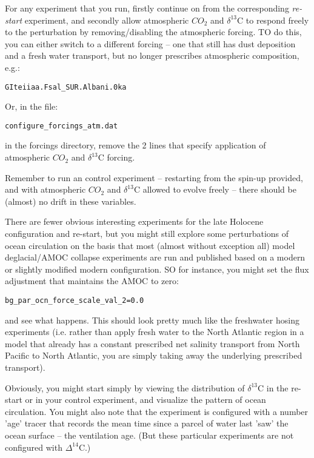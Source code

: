 \documentclass[11pt,fleqn]{book} %
\begin{document}
For any experiment that you run, firstly continue on from the corresponding \textit{re-start} experiment, and secondly allow atmospheric \(CO_{2}\) and $\delta^{13}$C to respond freely to the perturbation by removing/disabling the atmospheric forcing. TO do this, you can either switch to a different forcing -- one that still has dust deposition and a fresh water transport, but no longer prescribes atmospheric composition, e.g.:
\vspace{-2mm}\begin{verbatim}
GIteiiaa.Fsal_SUR.Albani.0ka
\end{verbatim}\vspace{-2mm}
Or, in the file:
\vspace{-2mm}\begin{verbatim}
configure_forcings_atm.dat
\end{verbatim}\vspace{-2mm}
in the forcings directory, remove the 2 lines that specify application of atmospheric \(CO_{2}\) and $\delta^{13}$C forcing.

Remember to run an control experiment -- restarting from the spin-up provided, and with atmospheric \(CO_{2}\) and $\delta^{13}$C allowed to evolve freely -- there should be (almost) no drift in these variables.

There are fewer obvious interesting experiments for the late Holocene configuration and re-start, but you might still explore some perturbations of ocean circulation on the basis that most (almost without exception all) model deglacial/AMOC collapse experiments are run and published based on a modern or slightly modified modern configuration. SO for instance, you might set the flux adjustment that maintains the AMOC to zero:
\vspace{-2mm}\begin{verbatim}
bg_par_ocn_force_scale_val_2=0.0
\end{verbatim}\vspace{-2mm}
and see what happens. This should look pretty much like the freshwater hosing experiments (i.e. rather than apply fresh water to the North Atlantic region in a model that already has a constant prescribed net salinity transport from North Pacific to North Atlantic, you are simply taking away the underlying prescribed transport).

Obviously, you might start simply by viewing the distribution of $\delta^{13}$C in the re-start or in your control experiment, and visualize the pattern of ocean circulation. You might also note that the experiment is configured with a number 'age' tracer that records the mean time since a parcel of water last 'saw' the ocean surface -- the ventilation age. (But these particular experiments are not configured with  $\Delta^{14}$C.)
\end{document}
